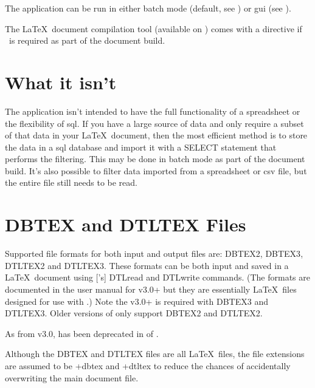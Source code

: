 The  application can be run in either 
batch mode (default, see ) 
or \gls{gui} (see ).

\begin{information}
The \LaTeX\ document compilation tool  (available on
) comes with a  directive 
if \appname\ is required as part of the document build.
\end{information}

\section{What it isn't}
\label{sec:notaspreadsheet}

The  application isn't intended to have the full functionality of
a spreadsheet or the flexibility of \gls{sql}. If you have a large
source of data and only require a subset of that data in your
\LaTeX\ document, then the most efficient method is to store the
data in a \gls{sql} database and import it with a SELECT statement
that performs the filtering. This may be done in batch mode as part
of the document build. It's also possible to filter data imported
from a spreadsheet or \gls{csv} file, but the entire file still
needs to be read.

\section{DBTEX and DTLTEX Files}
\label{sec:fileext}

Supported file formats for both input and output files are:
\gls{DBTEX2}, \gls{DBTEX3}, \gls{DTLTEX2} and \gls{DTLTEX3}.
These formats can be both input and saved in a \LaTeX\ document
using ['s] \gls{DTLread} and \gls{DTLwrite} commands.
(The formats are documented in the user manual for 
v3.0+ but they are essentially \LaTeX\ files designed for use with
.) Note the  v3.0+ is required with 
\gls{DBTEX3} and \gls{DTLTEX3}. Older versions of 
only support \gls{DBTEX2} and \gls{DTLTEX2}.

\begin{information}
As from  v3.0,  has been deprecated
in  of
.
\end{information}

Although the DBTEX and DTLTEX files are all \LaTeX\ files, the file 
extensions are assumed to be \ext+{dbtex} and \ext+{dtltex} to
reduce the chances of accidentally overwriting the main document
file.

